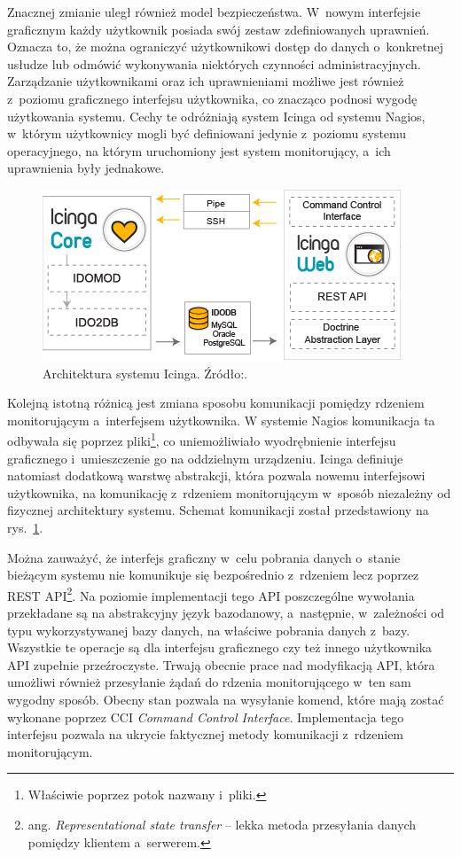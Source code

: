 Znacznej zmianie uległ również model bezpieczeństwa. W~nowym
interfejsie graficznym każdy użytkownik posiada swój zestaw
zdefiniowanych uprawnień. Oznacza to, że można ograniczyć
użytkownikowi dostęp do danych o~konkretnej usłudze lub odmówić
wykonywania niektórych czynności administracyjnych. Zarządzanie
użytkownikami oraz ich uprawnieniami możliwe jest również z~poziomu
graficznego interfejsu użytkownika, co znacząco podnosi wygodę
użytkowania systemu. Cechy te odróżniają system Icinga od systemu
Nagios, w~którym użytkownicy mogli być definiowani jedynie z~poziomu
systemu operacyjnego, na którym uruchomiony jest system monitorujący,
a~ich uprawnienia były jednakowe.

\begin{figure}[ht]
  \caption{Architektura systemu Icinga. Źródło:\cite{www:IcingaDoc}.}
  \label{fig:IcingaOverview}
  \centering
\includegraphics{img/icingaOverview.png}
\end{figure}

Kolejną istotną różnicą jest zmiana sposobu komunikacji pomiędzy
rdzeniem monitorującym a~interfejsem użytkownika. W systemie Nagios
komunikacja ta odbywała się poprzez pliki\footnote{Właściwie poprzez
  potok nazwany i~pliki.}, co uniemożliwiało wyodrębnienie interfejsu
graficznego i~umieszczenie go na oddzielnym urządzeniu. Icinga
definiuje natomiast dodatkową warstwę abstrakcji, która pozwala nowemu
interfejsowi użytkownika, na komunikację z~rdzeniem monitorującym
w~sposób niezależny od fizycznej architektury systemu. Schemat
komunikacji został przedstawiony na rys.~\ref{fig:IcingaOverview}.

Można zauważyć, że interfejs graficzny w~celu pobrania danych o~stanie
bieżącym systemu nie komunikuje się bezpośrednio z~rdzeniem lecz
poprzez REST API\footnote{ang. {\em Representational state transfer}
  -- lekka metoda przesyłania danych pomiędzy klientem
  a~serwerem.}. Na poziomie implementacji tego API poszczególne
wywołania przekładane są na abstrakcyjny język bazodanowy, a~następnie,
w~zależności od typu wykorzystywanej bazy danych, na właściwe pobrania
danych z~bazy. Wszystkie te operacje są dla interfejsu graficznego czy
też innego użytkownika API zupełnie przeźroczyste. Trwają obecnie
prace nad modyfikacją API, która umożliwi również przesyłanie żądań do
rdzenia monitorującego w~ten sam wygodny sposób. Obecny stan pozwala
na wysyłanie komend, które mają zostać wykonane poprzez CCI {\em
  Command Control Interface}. Implementacja tego interfejsu pozwala na
ukrycie faktycznej metody komunikacji z~rdzeniem monitorującym.

